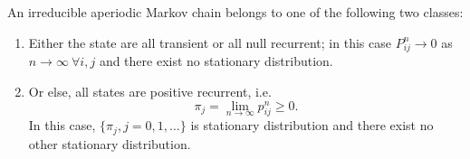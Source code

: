 \begin{theorem}
    An irreducible aperiodic Markov chain belongs to one of the following two classes:
    \begin{enumerate}
        \item Either the state are all transient or all null recurrent; in this case $ P^{n}_{ij}\to 0 $ as $ n\to \infty \ \forall i,j $
            and there exist no stationary distribution.
        \item Or else, all states are positive recurrent, i.e.
            \begin{equation}
                \label{stationart probability}
                \pi_{j} = \lim_{n\to \infty}p_{ij}^{n}\ge 0.
            \end{equation}
            In this case, $ \{\pi_{j},j=0,1,\ldots\} $ is stationary distribution and there exist no other stationary distribution.
    \end{enumerate}
\end{theorem}
